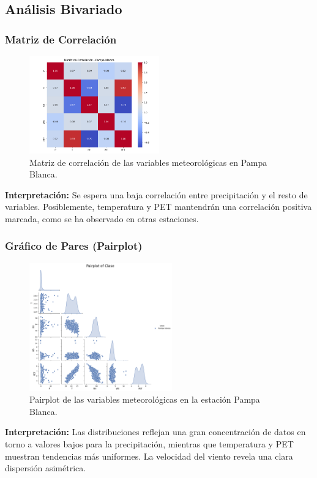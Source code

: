 \subsection{Análisis Bivariado}

\subsubsection*{Matriz de Correlación}
\begin{figure}[H]
\centering
\includegraphics[width=0.5\textwidth]{resultados/por_estacion_meteorologica/Pampa_Blanca/matriz_correlacion.png}
\caption{Matriz de correlación de las variables meteorológicas en Pampa Blanca.}
\label{fig:pampablanca_corr}
\end{figure}

\textbf{Interpretación:} Se espera una baja correlación entre precipitación y el resto de variables. Posiblemente, temperatura y PET mantendrán una correlación positiva marcada, como se ha observado en otras estaciones.

\subsubsection*{Gráfico de Pares (Pairplot)}
\begin{figure}[H]
\centering
\includegraphics[width=0.55\textwidth]{resultados/por_estacion_meteorologica/Pampa_Blanca/pairplot.png}
\caption{Pairplot de las variables meteorológicas en la estación Pampa Blanca.}
\label{fig:pampablanca_pairplot}
\end{figure}
\textbf{Interpretación:} Las distribuciones reflejan una gran concentración de datos en torno a valores bajos para la precipitación, mientras que temperatura y PET muestran tendencias más uniformes. La velocidad del viento revela una clara dispersión asimétrica.



